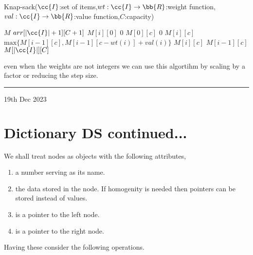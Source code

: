 \documentclass{myclass}
\begin{document}
\begin{algorithm}
    \caption*{Knap-sack($\cc{I}$:set of items,$wt:\cc{I}\to\bb{R}$:weight function,$val:\cc{I}\to\bb{R}$:value function,$C$:capacity)}
    \begin{algorithmic}[1]
        \State $M$ \ass $arr[|\cc{I}|+1][C+1]$
            \State $M[i][0]$ \ass $0$
        \EndFor
            \State $M[0][c]$ \ass $0$
        \EndFor
                    \State $M[i][c]$ \ass $\text{max}\{M[i-1][c],M[i-1][c-wt(i)]+val(i)\}$
                \Else
                    \State $M[i][c]$ \ass $M[i-1][c]$
                \EndIf
            \EndFor
        \EndFor
        \State {} $M[|\cc{I}|][C]$
    \end{algorithmic}
\end{algorithm}

even when the weights are not integers we can use this algortihm by scaling by a factor or reducing the step size.

\hrule
\vspace{-0.15cm}
\begin{flushleft}
    19th Dec 2023
\end{flushleft}
\vspace{-0.15cm}

\section*{Dictionary DS continued...}

We shall treat nodes as objects with the following attributes,

\begin{enumerate}
    \item {} a number serving as its name.
    \item {} the data stored in the node. If homogenity is needed then pointers can be stored instead of values.
    \item {} is a pointer to the left node.
    \item {} is a pointer to the right node.
\end{enumerate}

Having these consider the following operations.
\end{document}

